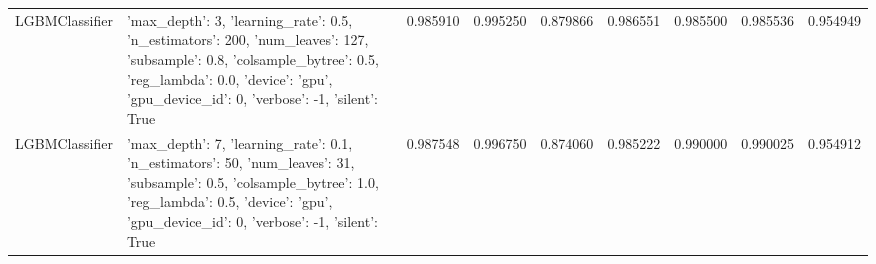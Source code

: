 \begin{tabular}{llrrrrrrr}
LGBMClassifier & {'max_depth': 3, 'learning_rate': 0.5, 'n_estimators': 200, 'num_leaves': 127, 'subsample': 0.8, 'colsample_bytree': 0.5, 'reg_lambda': 0.0, 'device': 'gpu', 'gpu_device_id': 0, 'verbose': -1, 'silent': True} & 0.985910 & 0.995250 & 0.879866 & 0.986551 & 0.985500 & 0.985536 & 0.954949 \\
LGBMClassifier & {'max_depth': 7, 'learning_rate': 0.1, 'n_estimators': 50, 'num_leaves': 31, 'subsample': 0.5, 'colsample_bytree': 1.0, 'reg_lambda': 0.5, 'device': 'gpu', 'gpu_device_id': 0, 'verbose': -1, 'silent': True} & 0.987548 & 0.996750 & 0.874060 & 0.985222 & 0.990000 & 0.990025 & 0.954912 \\
\bottomrule
\end{tabular}
